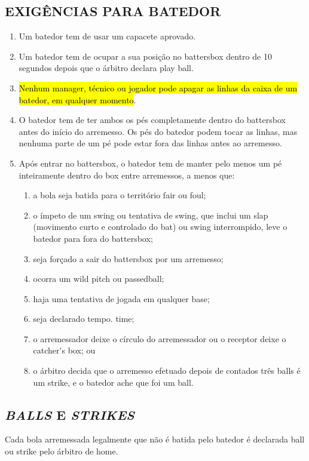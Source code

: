 \subsection{EXIGÊNCIAS PARA BATEDOR}
\begin{enumerate}[label=(\alph*)]
	\item   Um batedor tem de usar um capacete aprovado.
	\item  Um batedor tem de ocupar a sua posição no \gls{battersbox} dentro de 10 segundos depois que o árbitro declara \gls{play ball}.
	\item  \hl{Nenhum manager, t\'ecnico ou jogador pode apagar as linhas da caixa de um batedor, em qualquer momento}.

	\item  O batedor tem de ter ambos os pés completamente dentro do \gls{battersbox} antes do início do arremesso. Os pés do batedor podem tocar as linhas, mas nenhuma parte de um pé pode estar fora das linhas antes ao arremesso.
	\item  Após entrar no \gls{battersbox}, o batedor tem de manter pelo menos um pé inteiramente dentro do \gls{box} entre arremessos, a menos que:

	\begin{enumerate}[label=\roman*.]
		\item a bola seja batida para o território \gls{fair} ou \gls{foul};
		\item o ímpeto de um \gls{swing} ou tentativa de \gls{swing}, que inclui um \gls{slap} (movimento curto e controlado do \gls{bat}) ou \gls{swing} interrompido, leve o batedor para fora do \gls{battersbox};
		\item  seja forçado a sair do \gls{battersbox} por um arremesso;
		\item  ocorra um \gls{wild pitch} ou \gls{passedball};
		\item  haja uma tentativa de jogada em qualquer base;
		\item  seja declarado tempo. \gls{time};
		\item  o arremessador deixe o círculo do arremessador ou o receptor deixe o \gls{catcher's box}; ou
		\item  o árbitro decida que o arremesso efetuado depois de contados três \glspl{ball} é um \gls{strike}, e o batedor ache que foi um \gls{ball}.
	\end{enumerate}

\end{enumerate}
\subsection{\textit{BALLS} E \textit{STRIKES}}
Cada bola arremessada legalmente que não é batida pelo batedor é declarada \gls{ball} ou \gls{strike} pelo árbitro de \gls{home}.

